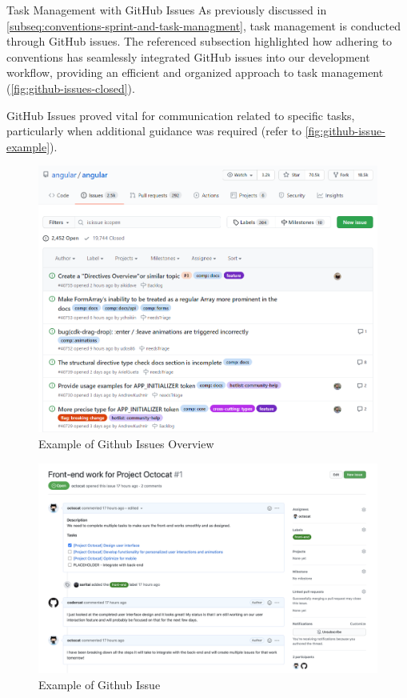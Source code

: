 \documentclass[12pt,a4paper]{article}
\begin{document}
\begin{spacing}{1.5}
    Task Management with GitHub Issues As previously discussed in
    \autoref{subseq:conventions-sprint-and-task-managment}, task management is
    conducted through GitHub issues. The referenced subsection highlighted how
    adhering to conventions has seamlessly integrated GitHub issues into our
    development workflow, providing an efficient and organized approach to task
    management (\autoref{fig:github-issues-closed}).

    GitHub Issues proved vital for communication related to specific tasks,
    particularly when additional guidance was required (refer to
    \autoref{fig:github-issue-example}).

    \begin{figure}[h]
        \centering
        \includegraphics[width=16cm]{assets/github-issue-overview-example.png}
        \caption{Example of Github Issues Overview}
        \label{fig:github-issues-closed}
    \end{figure}
    \FloatBarrier

    \begin{figure}[h]
        \centering
        \includegraphics[width=16cm]{assets/github-issue-example.png}
        \caption{Example of Github Issue}
        \label{fig:github-issue-example}%
    \end{figure}
    \FloatBarrier


\end{spacing}
\end{document}
